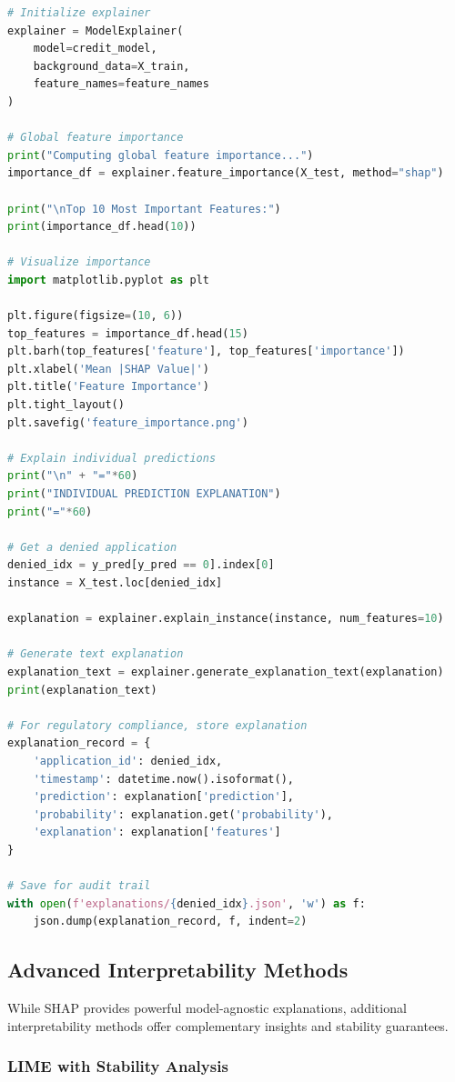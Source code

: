 \begin{lstlisting}[language=Python, caption={Model Interpretation}]
# Initialize explainer
explainer = ModelExplainer(
    model=credit_model,
    background_data=X_train,
    feature_names=feature_names
)

# Global feature importance
print("Computing global feature importance...")
importance_df = explainer.feature_importance(X_test, method="shap")

print("\nTop 10 Most Important Features:")
print(importance_df.head(10))

# Visualize importance
import matplotlib.pyplot as plt

plt.figure(figsize=(10, 6))
top_features = importance_df.head(15)
plt.barh(top_features['feature'], top_features['importance'])
plt.xlabel('Mean |SHAP Value|')
plt.title('Feature Importance')
plt.tight_layout()
plt.savefig('feature_importance.png')

# Explain individual predictions
print("\n" + "="*60)
print("INDIVIDUAL PREDICTION EXPLANATION")
print("="*60)

# Get a denied application
denied_idx = y_pred[y_pred == 0].index[0]
instance = X_test.loc[denied_idx]

explanation = explainer.explain_instance(instance, num_features=10)

# Generate text explanation
explanation_text = explainer.generate_explanation_text(explanation)
print(explanation_text)

# For regulatory compliance, store explanation
explanation_record = {
    'application_id': denied_idx,
    'timestamp': datetime.now().isoformat(),
    'prediction': explanation['prediction'],
    'probability': explanation.get('probability'),
    'explanation': explanation['features']
}

# Save for audit trail
with open(f'explanations/{denied_idx}.json', 'w') as f:
    json.dump(explanation_record, f, indent=2)
\end{lstlisting}

\subsection{Advanced Interpretability Methods}

While SHAP provides powerful model-agnostic explanations, additional interpretability methods offer complementary insights and stability guarantees.

\subsubsection{LIME with Stability Analysis}

